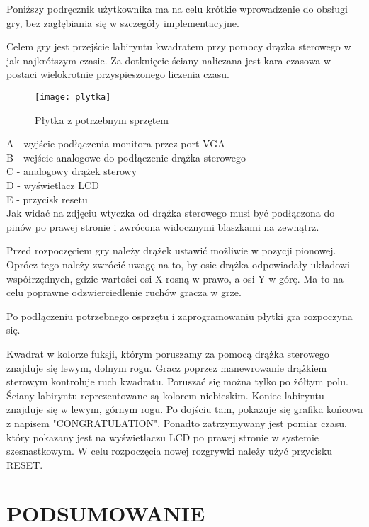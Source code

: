 \documentclass[11pt]{article}
\begin{document}
Poniższy podręcznik użytkownika ma na celu krótkie wprowadzenie do obsługi gry, bez zagłębiania się w szczegóły implementacyjne.

Celem gry jest przejście labiryntu kwadratem przy pomocy drązka sterowego w jak najkrótszym czasie. Za dotknięcie ściany naliczana jest kara czasowa w postaci wielokrotnie przyspieszonego liczenia czasu.

\begin{figure}
\centering
\texttt{[image: plytka]} %
\caption{Płytka z potrzebnym sprzętem}
\end{figure}

A - wyjście podłączenia monitora przez port VGA \\
B - wejście analogowe do podłączenie drążka sterowego \\
C - analogowy drążek sterowy \\
D - wyświetlacz LCD \\
E - przycisk resetu \\

Jak widać na zdjęciu wtyczka od drążka sterowego musi być podłączona do pinów po prawej stronie i zwrócona widocznymi blaszkami na zewnątrz.

Przed rozpoczęciem gry należy drążek ustawić możliwie w pozycji pionowej.
Oprócz tego należy zwrócić uwagę na to, by osie drążka odpowiadały układowi współrzędnych, gdzie wartości osi X rosną w prawo, a osi Y w górę.
Ma to na celu poprawne odzwierciedlenie ruchów gracza w grze. 
%

Po podłączeniu potrzebnego osprzętu i zaprogramowaniu płytki gra rozpoczyna się. 

Kwadrat w kolorze fuksji, którym poruszamy za pomocą drążka sterowego znajduje się lewym, dolnym rogu.
Gracz poprzez manewrowanie drążkiem sterowym kontroluje ruch kwadratu.
Poruszać się można tylko po żółtym polu. Ściany labiryntu reprezentowane są kolorem niebieskim.
Koniec labiryntu znajduje się w lewym, górnym rogu.
Po dojściu tam, pokazuje się grafika końcowa z napisem "CONGRATULATION". %
Ponadto zatrzymywany jest pomiar czasu, który pokazany jest na wyświetlaczu LCD po prawej stronie w systemie szesnastkowym.
W celu rozpoczęcia nowej rozgrywki należy użyć przycisku RESET.





\section{PODSUMOWANIE}
\end{document}
